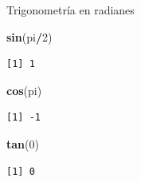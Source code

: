 \documentclass[
  ignorenonframetext,
]{beamer}
\newenvironment{Shaded}{\begin{snugshade}}{\end{snugshade}}
\newcommand{\DecValTok}[1]{\textcolor[rgb]{0.00,0.00,0.81}{#1}}
\newcommand{\FunctionTok}[1]{\textcolor[rgb]{0.13,0.29,0.53}{\textbf{#1}}}
\newcommand{\NormalTok}[1]{#1}
\newcommand{\SpecialCharTok}[1]{\textcolor[rgb]{0.81,0.36,0.00}{\textbf{#1}}}
\begin{document}
\begin{frame}[fragile]{Trigonometría en radianes}
\label{trigonometruxeda-en-radianes-1}
\begin{Shaded}
\begin{Highlighting}[]
\FunctionTok{sin}\NormalTok{(pi}\SpecialCharTok{/}\DecValTok{2}\NormalTok{)}
\end{Highlighting}
\end{Shaded}

\begin{verbatim}
[1] 1
\end{verbatim}

\begin{Shaded}
\begin{Highlighting}[]
\FunctionTok{cos}\NormalTok{(pi)}
\end{Highlighting}
\end{Shaded}

\begin{verbatim}
[1] -1
\end{verbatim}

\begin{Shaded}
\begin{Highlighting}[]
\FunctionTok{tan}\NormalTok{(}\DecValTok{0}\NormalTok{)}
\end{Highlighting}
\end{Shaded}

\begin{verbatim}
[1] 0
\end{verbatim}
\end{frame}
\end{document}
